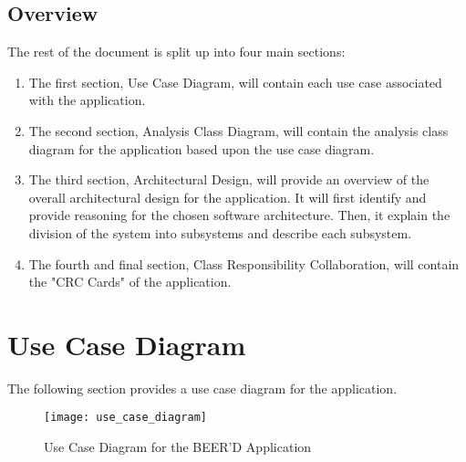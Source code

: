 \documentclass[]{article}
\begin{document}
\subsection{Overview}
\label{sub:overview}
The rest of the document is split up into four main sections:
\begin{enumerate}[-]
	\item The first section, Use Case Diagram, will contain each use case associated with the application. 
	\item The second section, Analysis Class Diagram, will contain the analysis class diagram for the application based upon the use case diagram.
	\item The third section, Architectural Design, will provide an overview of the overall architectural design for the application. It will first identify and provide reasoning for the chosen software architecture. Then, it explain the division of the system into subsystems and describe each subsystem.
	\item The fourth and final section, Class Responsibility Collaboration, will contain the "CRC Cards" of the application.
\end{enumerate}

\newpage
\section{Use Case Diagram}
\label{sec:use_case_diagram}
The following section provides a use case diagram for the application. \\

\begin{figure}[!ht]
\texttt{[image: use\_case\_diagram]}
\caption{Use Case Diagram for the BEER'D Application}
\end{figure}
\end{document}
